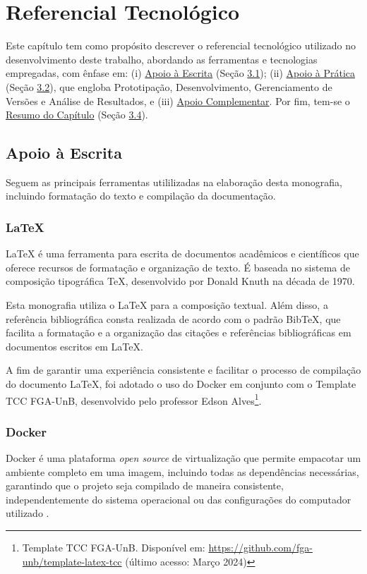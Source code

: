 \chapter[Referencial Tecnológico]{Referencial Tecnológico}
\label{chap:ReferencialTech}

Este capítulo tem como propósito descrever o referencial tecnológico utilizado no desenvolvimento
deste trabalho, abordando as ferramentas e tecnologias empregadas, com ênfase em: (i) \hyperref[sec:Apoio a Escrita]{Apoio à Escrita} (Seção \hyperref[sec:Apoio a Escrita]{3.1}); 
(ii) \hyperref[sec:Apoio à Prática]{Apoio à Prática} (Seção \hyperref[sec:Apoio à Prática]{3.2}), que engloba Prototipação, Desenvolvimento, Gerenciamento de Versões e Análise de Resultados, 
e (iii) \hyperref[sec:Apoio Complementar]{Apoio Complementar}. Por fim, tem-se o \hyperref[sec:Resumo do Capítulo]{Resumo do Capítulo} (Seção \hyperref[sec:Resumo do Capítulo]{3.4}).

\section{Apoio à Escrita}
\label{sec:Apoio a Escrita}
Seguem as principais ferramentas utililizadas na elaboração desta monografia, incluindo formatação do texto e compilação da documentação.

\subsection{LaTeX}
\label{sec:Latex}
LaTeX \cite{latex} é uma ferramenta para escrita de documentos acadêmicos e científicos que oferece 
recursos de formatação e organização de texto. É baseada no sistema de composição tipográfica 
TeX, desenvolvido por Donald Knuth na década de 1970.

Esta monografia utiliza o LaTeX para a composição textual. Além disso, a referência bibliográfica 
consta realizada de acordo com o padrão BibTeX, que facilita a formatação e a organização das citações e 
referências bibliográficas em documentos escritos em LaTeX.

A fim de garantir uma experiência consistente e facilitar o processo de compilação do documento LaTeX, foi 
adotado o uso do Docker em conjunto com o Template TCC FGA-UnB, desenvolvido pelo professor 
Edson Alves\footnote{Template TCC FGA-UnB. Disponível
em: \url{https://github.com/fga-unb/template-latex-tcc} (último acesso: Março 2024)}.

\subsection{Docker}
\label{sec:Docker}
Docker é uma plataforma \textit{open source} de virtualização que permite empacotar um ambiente completo em 
uma imagem, incluindo todas as dependências necessárias, garantindo que o projeto seja 
compilado de maneira consistente, independentemente do sistema operacional ou das configurações do computador   
utilizado \cite{docker}.

